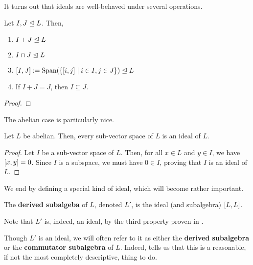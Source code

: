 It turns out that ideals are well-behaved under several operations.

\begin{boxproposition}\label{Ch1:Prop:IdealBhv}
    Let $I, J \trianglelefteq L$. Then,
    \begin{enumerate}[label = \normalfont\arabic*., noitemsep]
        \item $I + J \trianglelefteq L$
        \item $I \cap J \trianglelefteq L$
        \item $\left[ I, J \right] := \operatorname{Span}\!\left( \left\{ \left[ i, j \right] \; \middle\vert \; i \in I, j \in J \right\} \right) \trianglelefteq L$
        \item If $I + J = J$, then $I \subseteq J$.
    \end{enumerate}
\end{boxproposition}
\begin{proof}
    \sorry
\end{proof}

The abelian case is particularly nice.

\begin{proposition}\label{Ch1:Prop:SubspaceIdealOfAbelian}
    Let $L$ be abelian. Then, every sub-vector space of $L$ is an ideal of $L$.
\end{proposition}
\begin{proof}
    Let $I$ be a sub-vector space of $L$. Then, for all $x \in L$ and $y \in I$, we have $\left[ x, y \right] = 0$. Since $I$ is a subspace, we must have $0 \in I$, proving that $I$ is an ideal of $L$.
\end{proof}

We end by defining a special kind of ideal, which will become rather important.

\begin{boxdefinition}\label{Ch1:Def:DerivedSubalg}
    The \textbf{derived subalgeba} of $L$, denoted $L'$, is the ideal (and subalgebra) $\left[ L, L \right]$.
\end{boxdefinition}

Note that $L'$ is, indeed, an ideal, by the third property proven in .

\begin{boxconvention}
    Though $L'$ is an ideal, we will often refer to it as either the \textbf{derived subalgebra} or the \textbf{commutator subalgebra} of $L$. Indeed,  tells us that this is a reasonable, if not the most completely descriptive, thing to do.
\end{boxconvention}


